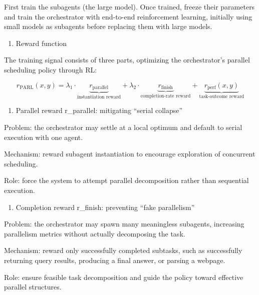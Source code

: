 First train the subagents (the large model). Once trained, freeze their parameters and train the orchestrator with end-to-end reinforcement learning, initially using small models as subagents before replacing them with large models.

\begin{enumerate}
\def\labelenumi{\arabic{enumi}.}
\setcounter{enumi}{2}
\tightlist
\item
  Reward function
\end{enumerate}

The training signal consists of three parts, optimizing the orchestrator's parallel scheduling policy through RL:

\[
r_{\mathrm{PARL}}(x,y)=\lambda_1\cdot\underbrace{r_{\mathrm{parallel}}}_{\text{instantiation reward}}+\lambda_2\cdot\underbrace{r_{\mathrm{finish}}}_{\text{completion-rate reward}}+\underbrace{r_{\mathrm{perf}}(x,y)}_{\text{task-outcome reward}}
\]

\begin{enumerate}
\def\labelenumi{(\arabic{enumi})}
\tightlist
\item
  Parallel reward r\_parallel: mitigating ``serial collapse''
\end{enumerate}

Problem: the orchestrator may settle at a local optimum and default to serial execution with one agent.

Mechanism: reward subagent instantiation to encourage exploration of concurrent scheduling.

Role: force the system to attempt parallel decomposition rather than sequential execution.

\begin{enumerate}
\def\labelenumi{(\arabic{enumi})}
\setcounter{enumi}{1}
\tightlist
\item
  Completion reward r\_finish: preventing ``fake parallelism''
\end{enumerate}

Problem: the orchestrator may spawn many meaningless subagents, increasing parallelism metrics without actually decomposing the task.

Mechanism: reward only successfully completed subtasks, such as successfully returning query results, producing a final answer, or parsing a webpage.

Role: ensure feasible task decomposition and guide the policy toward effective parallel structures.

